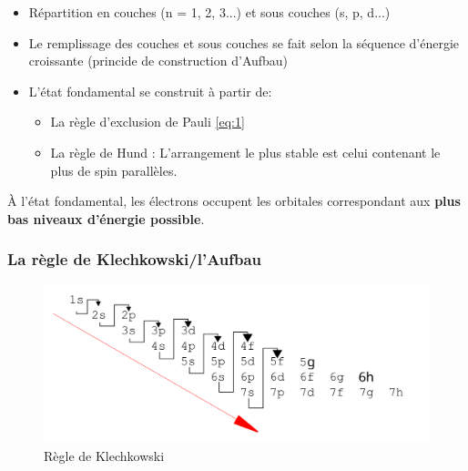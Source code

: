 \documentclass[10pt,a4paper]{book}
\begin{document}
\begin{itemize}
\item Répartition en couches (n = 1, 2, 3...) et sous couches (s, p, d...)
\item Le remplissage des couches et sous couches se fait selon la séquence d'énergie croissante (princide de construction d'Aufbau)
\item L'état fondamental se construit à partir de:
\begin{itemize}
	\item La règle d'exclusion de Pauli \ref{eq:1}
	\item La règle de Hund : L'arrangement le plus stable est celui contenant le plus de spin parallèles.
\end{itemize}
\end{itemize}
\par À l'état fondamental, les électrons occupent les orbitales correspondant aux \textbf{plus bas niveaux d'énergie possible}.

\subsubsection{La règle de Klechkowski/l'Aufbau}

\begin{figure}[h!]
\begin{center}
\includegraphics[scale=0.15]{./assets/klechkowski_rule.png}
\caption{Règle de Klechkowski}
\label{fig:klechkowski}
\end{center}
\end{figure}
\end{document}
